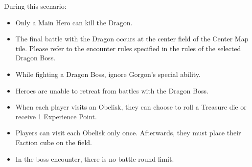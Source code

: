 \begin{multicols*}{2}
During this scenario:

\begin{itemize}
  \item Only a Main Hero can kill the Dragon.
  \item The final battle with the Dragon occurs at the center field of the Center Map tile.
    Please refer to the encounter rules specified in the rules of the selected Dragon Boss.
  \item While fighting a Dragon Boss, ignore Gorgon's special ability.
  \item Heroes are unable to retreat from battles with the Dragon Boss.
  \item When each player visits an Obelisk, they can choose to roll a Treasure die or receive 1 Experience Point.
  \item Players can visit each Obelisk only once.
    Afterwards, they must place their Faction cube on the field.
  \item In the boss encounter, there is no battle round limit.
\end{itemize}



\end{multicols*}

\clearpage

